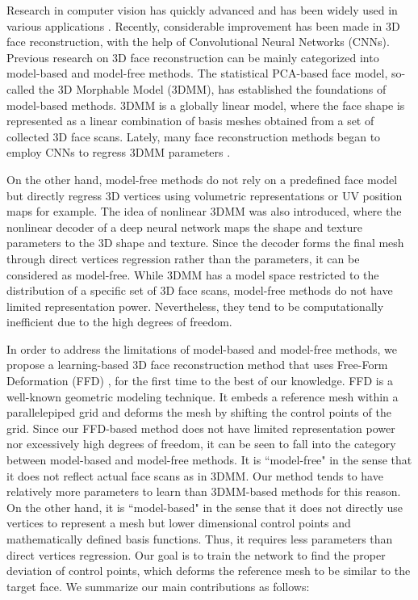 \documentclass[letterpaper, 10 pt, conference]{ieeeconf}
\begin{document}
Research in computer vision has quickly advanced and has been widely used in various applications \cite{yang2007reconstruction, he2016deep, lee1990translation, lim2000text, zhu2016face}. Recently, considerable improvement has been made in 3D face reconstruction, with the help of Convolutional Neural Networks (CNNs).
Previous research on 3D face reconstruction can be mainly categorized into model-based and model-free methods. The statistical PCA-based face model, so-called the 3D Morphable Model (3DMM), has established the foundations of model-based methods. 3DMM is a globally linear model, where the face shape is represented as a linear combination of basis meshes obtained from a set of collected 3D face scans. Lately, many face reconstruction methods began to employ CNNs to regress 3DMM parameters \cite{zhu2016face, guo2020towards, liu2017dense, sanyal2019learning, tewari2017mofa}. 

On the other hand, model-free methods do not rely on a predefined face model but directly regress 3D vertices using volumetric representations \cite{jackson2017large} or UV position maps \cite{feng2018joint} for example. The idea of nonlinear 3DMM \cite{zhou2019dense, tran2018nonlinear} was also introduced, where the nonlinear decoder of a deep neural network maps the shape and texture parameters to the 3D shape and texture. Since the decoder forms the final mesh through direct vertices regression rather than the parameters, it can be considered as model-free. While 3DMM has a model space restricted to the distribution of a specific set of 3D face scans, model-free methods do not have limited representation power. Nevertheless, they tend to be computationally inefficient due to the high degrees of freedom.

In order to address the limitations of model-based and model-free methods, we propose a learning-based 3D face reconstruction method that uses Free-Form Deformation (FFD) \cite{hsu1992direct}, for the first time to the best of our knowledge. FFD is a well-known geometric modeling technique. It embeds a reference mesh within a parallelepiped grid and deforms the mesh by shifting the control points of the grid. Since our FFD-based method does not have limited representation power nor excessively high degrees of freedom, it can be seen to fall into the category between model-based and model-free methods. It is ``model-free" in the sense that it does not reflect actual face scans as in 3DMM. Our method tends to have relatively more parameters to learn than 3DMM-based methods for this reason. On the other hand, it is ``model-based" in the sense that it does not directly use vertices to represent a mesh but lower dimensional control points and mathematically defined basis functions. Thus, it requires less parameters than direct vertices regression. Our goal is to train the network to find the proper deviation of control points, which deforms the reference mesh to be similar to the target face. We summarize our main contributions as follows:
\end{document}
